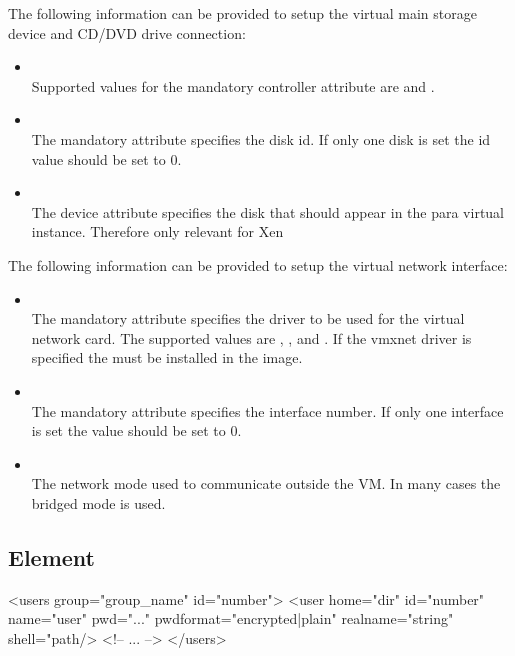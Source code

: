 \begin{itemize}
	The following information can be provided to setup the virtual
	main storage device and CD/DVD drive connection:

	\begin{itemize}
	\item {}\\
      Supported values for the mandatory controller attribute are 
      and .
	\item {}\\
      The mandatory  attribute specifies the disk id. If only one
      disk is set the id value should be set to 0.
	\item {}\\
      The device attribute specifies the disk that should appear
      in the para virtual instance. Therefore only relevant for Xen
	\end{itemize}

	The following information can be provided to setup the virtual
	network interface:

	\begin{itemize}
	\item {}\\
      The mandatory  attribute specifies the driver to be used for
      the virtual network card. The supported values are ,
      , and . If the vmxnet driver is
      specified the  must be installed in the image.
	\item {}\\
      The mandatory  attribute specifies the interface number. If
      only one interface is set the value should be set to 0.
	\item {}\\
      The network mode used to communicate outside the VM. In many cases
      the bridged mode is used.
	\end{itemize}
\end{itemize}

\subsection{ Element}
\begin{xml}
<users group="group_name" id="number">
  <user home="dir" id="number" name="user" pwd="..."
        pwdformat="encrypted|plain"
        realname="string" shell="path/>
  <!-- ... -->
</users>
\end{xml}

